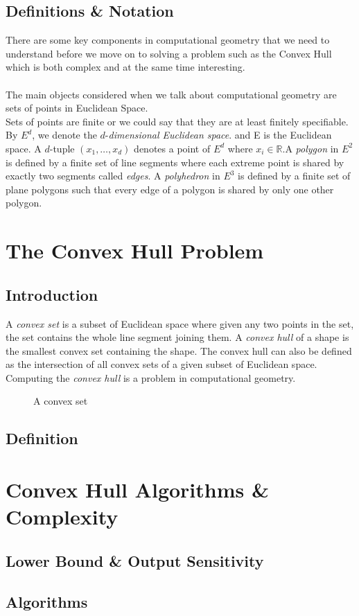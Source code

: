 \documentclass[paper=a4, fontsize=11pt]{scrartcl}
\numberwithin{equation}{section}		%
\numberwithin{figure}{section}			%
\numberwithin{table}{section}				%
\begin{document}
\subsection{Definitions \& Notation}
There are some key components in computational geometry that we need to understand before we move on to solving a problem such as the Convex Hull which is both complex and at the same time interesting. \\
\\
The main objects considered when we talk about computational geometry are sets of points in Euclidean Space. \\
Sets of points are finite or we could say that they are at least finitely specifiable.
By $E^d$, we denote the $d$-\textit{dimensional Euclidean space}. and E is the Euclidean space. A $d$-tuple $(x_1,\dots, x_d)$ denotes a point of $E^d$ where $x_i \in \mathbb{R}$.A \emph{polygon} in $E^2$ is defined by a finite set of line segments where each extreme point is shared by exactly two segments called \textit{edges}.
A \textit{polyhedron} in $E^3$ is defined by a finite set of plane polygons such that every edge of a polygon is shared by only one other polygon.

\section{The Convex Hull Problem}
\subsection{Introduction}
A \emph{convex set} is a subset of Euclidean space where given any two points in the set,  the set contains the whole line segment joining them. A  \emph{convex hull} of a shape is the smallest convex set containing the shape.
The convex hull can also be defined as the intersection of all convex sets of a given subset of Euclidean space.
Computing the \emph{convex hull} is a problem in computational geometry. 

    \begin{figure} [H]
            \centering
            \caption{A convex set}
            \label{convex}
    \end{figure}
\subsection{Definition}

\section{Convex Hull Algorithms & Complexity}
\subsection{Lower Bound & Output Sensitivity}



\subsection{Algorithms}


\end{document}
